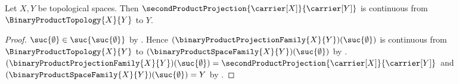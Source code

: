 \begin{theorem}\label{second_product_projection_continuous}
    Let $X,Y$ be topological spaces.
    Then $\secondProductProjection{\carrier[X]}{\carrier[Y]}$ is continuous
        from $\BinaryProductTopology{X}{Y}$ to $Y$.
\end{theorem}
\begin{proof}
    $\suc{\emptyset}\in\suc{\suc{\emptyset}}$ by
        .
    Hence $(\binaryProductProjectionFamily{X}{Y})(\suc{\emptyset})$
        is continuous from $\BinaryProductTopology{X}{Y}$ to
        $(\binaryProductSpaceFamily{X}{Y})(\suc{\emptyset})$ by
        .
    $(\binaryProductProjectionFamily{X}{Y})(\suc{\emptyset})
        =\secondProductProjection{\carrier[X]}{\carrier[Y]}$ and
        $(\binaryProductSpaceFamily{X}{Y})(\suc{\emptyset})=Y$ by
        .
\end{proof}

